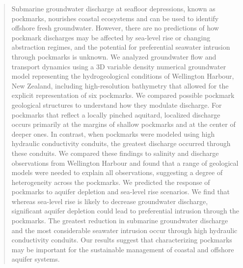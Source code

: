\documentclass[pdflatex,sn-apa]{sn-jnl}%
\begin{document}
\begin{abstract}
Submarine groundwater discharge at seafloor depressions, known as pockmarks, nourishes coastal ecosystems and can be used to identify offshore fresh groundwater.
However, there are no predictions of how pockmark discharges may be affected by sea-level rise or changing abstraction regimes, and the potential for preferential seawater intrusion through pockmarks is unknown.
We analyzed groundwater flow and transport dynamics using a 3D variable density numerical groundwater model representing the hydrogeological conditions of Wellington Harbour,
New Zealand, including high-resolution bathymetry that allowed for the explicit representation of six pockmarks.
We compared possible pockmark geological structures to understand how they modulate discharge.
For pockmarks that reflect a locally pinched aquitard, localized discharge occurs primarily at the margins of shallow pockmarks and at the center of deeper ones.
In contrast, when pockmarks were modeled using high hydraulic conductivity conduits, the greatest discharge occurred through these conduits.
We compared these findings to salinity and discharge observations from Wellington Harbour and found that a range of geological models were needed to explain all observations,
suggesting a degree of heterogeneity across the pockmarks.
We predicted the response of pockmarks to aquifer depletion and sea-level rise scenarios.
We find that whereas sea-level rise is likely to decrease groundwater discharge, significant aquifer depletion could lead to preferential intrusion through the pockmarks.
The greatest reduction in submarine groundwater discharge and the most considerable seawater intrusion occur through high hydraulic conductivity conduits.
Our results suggest that characterizing pockmarks may be important for the sustainable management of coastal and offshore aquifer systems.
\end{abstract}
\end{document}
